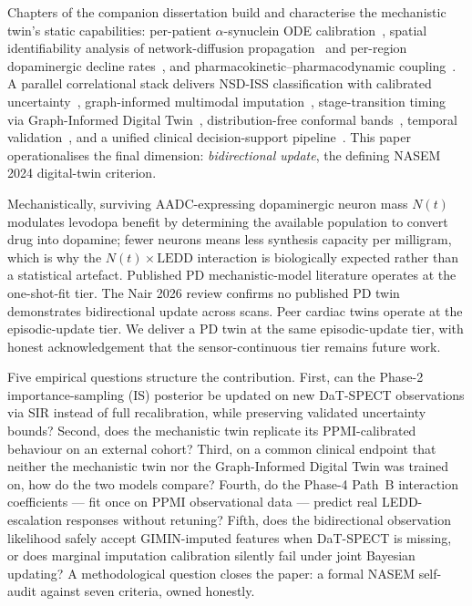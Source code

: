 Chapters of the companion dissertation\cite{dupre2026dissertation} build and characterise the mechanistic twin's static capabilities: per-patient $\alpha$-synuclein ODE calibration~\cite{dupre2026paper7}, spatial identifiability analysis of network-diffusion propagation~\cite{dupre2026paper8a} and per-region dopaminergic decline rates~\cite{dupre2026paper8b}, and pharmacokinetic--pharmacodynamic coupling~\cite{dupre2026paper9}. A parallel correlational stack delivers NSD-ISS classification with calibrated uncertainty~\cite{dupre2026paper1}, graph-informed multimodal imputation~\cite{dupre2026paper2}, stage-transition timing via Graph-Informed Digital Twin~\cite{dupre2026paper3}, distribution-free conformal bands~\cite{dupre2026paper4}, temporal validation~\cite{dupre2026paper5}, and a unified clinical decision-support pipeline~\cite{dupre2026paper6}. This paper operationalises the final dimension: \emph{bidirectional update}, the defining NASEM 2024 digital-twin criterion\cite{NASEM2024DigitalTwins}.

Mechanistically, surviving AADC-expressing dopaminergic neuron mass $N(t)$ modulates levodopa benefit by determining the available population to convert drug into dopamine; fewer neurons means less synthesis capacity per milligram, which is why the $N(t) \times \mathrm{LEDD}$ interaction is biologically expected rather than a statistical artefact. Published PD mechanistic-model literature\cite{veronneau2020chaos,veronneau2020integrative} operates at the one-shot-fit tier. The Nair 2026 review\cite{nair2026computationalpd} confirms no published PD twin demonstrates bidirectional update across scans. Peer cardiac twins\cite{corralacero2020cardiac,coorey2021healthdt} operate at the episodic-update tier. We deliver a PD twin at the same episodic-update tier, with honest acknowledgement that the sensor-continuous tier remains future work.

Five empirical questions structure the contribution. First, can the Phase-2 importance-sampling (IS) posterior be updated on new DaT-SPECT observations via SIR instead of full recalibration, while preserving validated uncertainty bounds? Second, does the mechanistic twin replicate its PPMI-calibrated behaviour on an external cohort? Third, on a common clinical endpoint that neither the mechanistic twin nor the Graph-Informed Digital Twin was trained on, how do the two models compare? Fourth, do the Phase-4 Path~B interaction coefficients --- fit once on PPMI observational data --- predict real LEDD-escalation responses without retuning? Fifth, does the bidirectional observation likelihood safely accept GIMIN-imputed features when DaT-SPECT is missing, or does marginal imputation calibration silently fail under joint Bayesian updating? A methodological question closes the paper: a formal NASEM self-audit against seven criteria, owned honestly.

